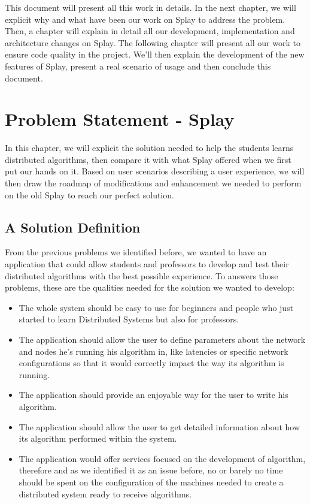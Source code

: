 \documentclass{eplmastersthesis}
\begin{document}
      This document will present all this work in details. In the next chapter,
      we will explicit why and what have been our work on Splay to address
      the problem. Then, a chapter will explain in detail all our
      development, implementation and architecture changes on Splay. The
      following chapter will present all our work to ensure code quality
      in the project. We'll then explain the development of the new features
      of Splay, present a real scenario of usage and then conclude this document.

  \chapter{Problem Statement - Splay}

    In this chapter, we will explicit the solution needed to help the
    students learns distributed algorithms, then compare it with what Splay
    offered when we first put our hands on it. Based on user scenarios
    describing a user experience, we will then draw the roadmap of modifications
    and enhancement we needed to perform on the old Splay to reach our
    perfect solution.

    \section{A Solution Definition}

      From the previous problems we identified before, we wanted to have an
      application that could allow students and professors to develop and
      test their distributed algorithms with the best possible experience.
      To answers those problems, these are the qualities needed for the
      solution we wanted to develop:

      \begin{itemize}
        \item The whole system should be easy to use for beginners and people
        who just started to learn Distributed Systems but also for professors.
        \item The application should allow the user to define parameters about
        the network and nodes he's running his algorithm in, like latencies
        or specific network configurations so that it would correctly
        impact the way its algorithm is running.
        \item The application should provide an enjoyable way for the user
        to write his algorithm.
        \item The application should allow the user to get detailed information
        about how its algorithm performed within the system.
        \item The application would offer services focused on the development
        of algorithm, therefore and as we identified it as an issue before, no
        or barely no time should be spent on the configuration of the machines
        needed to create a distributed system ready to receive algorithms.
      \end{itemize}
\end{document}
